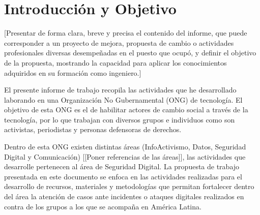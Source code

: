 \documentclass[12pt]{caltech_thesis}
\begin{document}
\chapter{Introducción y Objetivo}

[Presentar de forma clara, breve y precisa el contenido del informe, que puede corresponder a un proyecto de mejora, propuesta de cambio o actividades profesionales diversas desempeñadas en el puesto que ocupó, y definir el objetivo de la propuesta, mostrando la capacidad para aplicar los conocimientos adquiridos en su formación como ingeniero.]

El presente informe de trabajo recopila las actividades que he desarrollado laborando en una Organización No Gubernamental (ONG)  de tecnología. El objetivo de esta ONG es el de habilitar actores de cambio social a través de la tecnología, por lo que trabajan con diversos grupos e individuos como son activistas, periodistas y personas defensoras de derechos.

Dentro de esta ONG existen distintas áreas (InfoActivismo, Datos, Seguridad Digital y Comunicación) [[Poner referencias de las áreas]], las actividades que desarrolle pertenecen al área de Seguridad Digital. La propuesta de trabajo presentada en este documento se enfoca en las actividades realizadas para el desarrollo de recursos, materiales y metodologías que permitan fortalecer dentro del área la atención de casos ante incidentes  o ataques digitales  realizados en contra de los grupos a los que se acompaña en América Latina.





\end{document}
